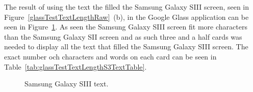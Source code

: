 The result of using the text the filled the Samsung Galaxy SIII screen, seen in Figure~\ref{glassTestTextLengthRaw}~(b), in the Google Glass application can be seen in Figure~\ref{glassTestTextLengthS3Text}. As seen the Samsung Galaxy SIII screen fit more characters than the Samsung Galaxy SII screen and as such three and a half cards was needed to display all the text that filled the Samsung Galaxy SIII screen. The exact number och characters and words on each card can be seen in Table~\ref{tab:glassTestTextLengthS3TextTable}.

	\begin{figure}[H]%
		\centering
   		 \qquad
   		 \qquad
   		 \qquad
   		 \qquad
		\caption{Samsung Galaxy SIII text.}
		\label{glassTestTextLengthS3Text}
	\end{figure}

